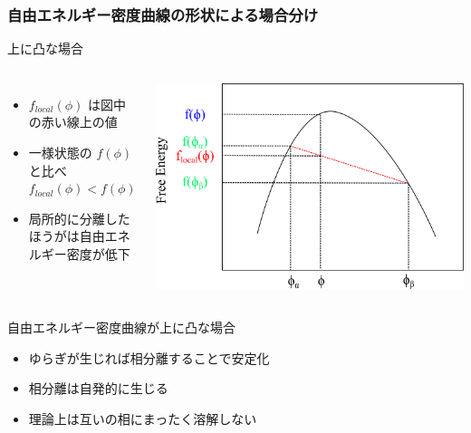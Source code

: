 \documentclass[12pt, dvipdfmx]{beamer}
\begin{document}
\begin{frame}
	\frametitle{自由エネルギー密度曲線の形状による場合分け}
		\begin{block}{上に凸な場合}
			\begin{columns}[c, onlytextwidth]
					\begin{itemize}
						\item $f_{local}(\phi)$ は図中の赤い線上の値
						\item 一様状態の $f (\phi)$ と比べ\\
						$f_{local}(\phi) < f (\phi)$
						\item \alert{局所的に分離したほうがは自由エネルギー密度が低下}
					\end{itemize}
						\centering
							\includegraphics[width=\textwidth]{freeEform_3.png}
			\end{columns}
		\end{block}
 
		\begin{alertblock}{自由エネルギー密度曲線が上に凸な場合}
			\begin{itemize}
				\item ゆらぎが生じれば相分離することで安定化
				\item 相分離は自発的に生じる
				\item 理論上は互いの相にまったく溶解しない
			\end{itemize}
		\end{alertblock}
\end{frame}
\end{document}
